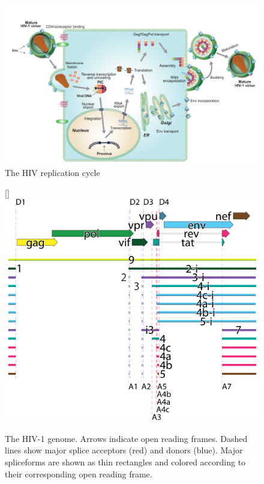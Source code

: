 \documentclass[../sherrill-Mix_thesis.tex]{subfiles}
\begin{document}
	\begin{figure}
		\centering
		\includegraphics[width=\textwidth]{lifecycle.pdf}
		\caption[The HIV replication cycle]{The HIV replication cycle} %
		\label{figHIVLifecycle}
	\end{figure}

	\begin{figure}
		\centering
		[\FBwidth]{
			\includegraphics[width=.7\textwidth]{exonProt2.pdf}
		}{
			\caption[The HIV-1 genome]{The HIV-1 genome. Arrows indicate open reading frames. Dashed lines show major splice acceptors (red) and donors (blue). Major spliceforms are shown as thin rectangles and colored according to their corresponding open reading frame.}
			\label{figHIVGenome}
		}
	\end{figure}
\end{document}
